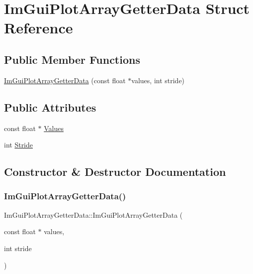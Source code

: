 \hypertarget{struct_im_gui_plot_array_getter_data}{}\section{Im\+Gui\+Plot\+Array\+Getter\+Data Struct Reference}
\label{struct_im_gui_plot_array_getter_data}
\subsection*{Public Member Functions}
\begin{DoxyCompactItemize}
\item 
\hyperlink{struct_im_gui_plot_array_getter_data_a9c4037621f1c247957c04dc8ae1f2903}{Im\+Gui\+Plot\+Array\+Getter\+Data} (const float $\ast$values, int stride)
\end{DoxyCompactItemize}
\subsection*{Public Attributes}
\begin{DoxyCompactItemize}
\item 
const float $\ast$ \hyperlink{struct_im_gui_plot_array_getter_data_aa40ff2e945549744fc622891089ae0fd}{Values}
\item 
int \hyperlink{struct_im_gui_plot_array_getter_data_aecb2cce4ea91d95ec81937de656cfcd6}{Stride}
\end{DoxyCompactItemize}


\subsection{Constructor \& Destructor Documentation}
\hypertarget{struct_im_gui_plot_array_getter_data_a9c4037621f1c247957c04dc8ae1f2903}{}\label{struct_im_gui_plot_array_getter_data_a9c4037621f1c247957c04dc8ae1f2903} 
\subsubsection{\texorpdfstring{Im\+Gui\+Plot\+Array\+Getter\+Data()}{ImGuiPlotArrayGetterData()}}
{\footnotesize\ttfamily Im\+Gui\+Plot\+Array\+Getter\+Data\+::\+Im\+Gui\+Plot\+Array\+Getter\+Data (\begin{DoxyParamCaption}\item[{const float $\ast$}]{values,  }\item[{int}]{stride }\end{DoxyParamCaption})}



